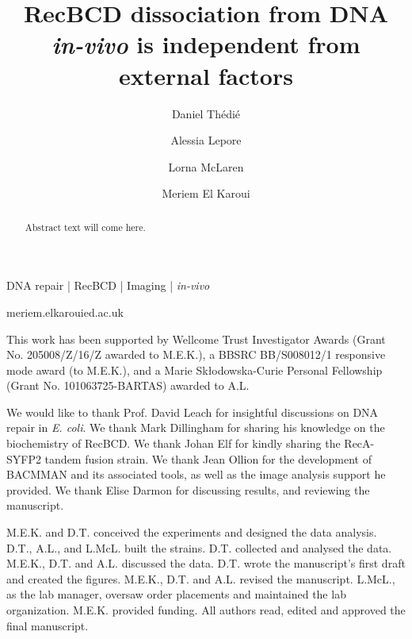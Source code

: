 \documentclass[times, twoside]{zHenriquesLab-StyleBioRxiv}
\begin{document}
\title{RecBCD dissociation from DNA \emph{in-vivo} is independent from external factors}
\shorttitle{}

\author[1]{Daniel Thédié}
\author[2]{Alessia Lepore}
\author[1]{Lorna McLaren}
\author[1]{Meriem El Karoui}



\maketitle

\begin{abstract}
Abstract text will come here.
\end{abstract}

\begin{keywords}
DNA repair | RecBCD | Imaging | \emph{in-vivo}
\end{keywords}

\begin{corrauthor}
meriem.elkaroui\at ed.ac.uk
\end{corrauthor}










\begin{funding}
This work has been supported by Wellcome Trust Investigator Awards (Grant No. 205008/Z/16/Z awarded to M.E.K.), a BBSRC BB/S008012/1 responsive mode award (to M.E.K.), and a Marie Skłodowska-Curie Personal Fellowship (Grant No. 101063725-BARTAS) awarded to A.L.
\end{funding}

\begin{acknowledgements}
We would like to thank Prof. David Leach for insightful discussions on DNA repair in \emph{E. coli}. We thank Mark Dillingham for sharing his knowledge on the biochemistry of RecBCD. We thank Johan Elf for kindly sharing the RecA-SYFP2 tandem fusion strain. We thank Jean Ollion for the development of BACMMAN and its associated tools, as well as the image analysis support he provided. We thank Elise Darmon for discussing results, and reviewing the manuscript.
\end{acknowledgements}

\begin{contributions}
M.E.K. and D.T. conceived the experiments and designed the data analysis. D.T., A.L., and L.McL. built the strains. D.T. collected and analysed the data. M.E.K., D.T. and A.L. discussed the data. D.T. wrote the manuscript's first draft and created the figures. M.E.K., D.T. and A.L. revised the manuscript. L.McL., as the lab manager, oversaw order placements and maintained the lab organization. M.E.K. provided funding. All authors read, edited and approved the final manuscript.
\end{contributions}
\end{document}
